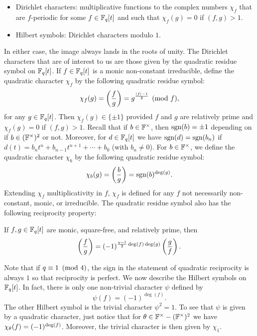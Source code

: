 \documentclass[12pt,reqno,oneside]{amsart}
\begin{document}
        \begin{itemize}
            \item Dirichlet characters: multiplicative functions to the complex numbers $\chi_{f}$ that are $f$-periodic for some $f \in \mathbb{F}_{q}[t]$ and such that $\chi_{f}(g) = 0$ if $(f,g) > 1$.
            \item Hilbert symbols: Dirichlet characters modulo $1$.
        \end{itemize}
        
        In either case, the image always lands in the roots of unity. The Dirichlet characters that are of interest to us are those given by the quadratic residue symbol on $\mathbb{F}_{q}[t]$. If $f \in \mathbb{F}_{q}[t]$ is a monic non-constant irreducible, define the quadratic character $\chi_{f}$ by the following quadratic residue symbol:
        \[
            \chi_{f}(g) = \left(\frac{f}{g}\right) = g^{\frac{|f|-1}{2}} \pmod{f},
        \]
        for any $g \in \mathbb{F}_{q}[t]$. Then $\chi_{f}(g) \in \{\pm 1\}$ provided $f$ and $g$ are relatively prime and $\chi_{f}(g) = 0$ if $(f,g) > 1$. Recall that if $b \in \mathbb{F}^{\times}$, then $\operatorname{\mathrm{sgn}}(b) = \pm1$ depending on if $b \in (\mathbb{F}^{\times})^{2}$ or not. Moreover, for $d \in \mathbb{F}_{q}[t]$ we have $\operatorname{\mathrm{sgn}}(d) = \operatorname{\mathrm{sgn}}(b_{n})$ if $d(t) = b_{n}t^{n}+b_{n-1}t^{n+1}+\cdots+b_{0}$ (with $b_{n} \neq 0$). For $b \in \mathbb{F}^{\times}$, we define the quadratic character $\chi_{b}$ by the following quadratic residue symbol:
        \[
            \chi_{b}(g) = \left(\frac{b}{g}\right) = \operatorname{\mathrm{sgn}}(b)^{\deg(g)}.
        \]
        Extending $\chi_{f}$ multiplicativity in $f$, $\chi_{f}$ is defined for any $f$ not necessarily non-constant, monic, or irreducible. The quadratic residue symbol also has the following reciprocity property:

        \begin{theorem}
            If $f,g \in \mathbb{F}_{q}[t]$ are monic, square-free, and relatively prime, then
            \[
                \left(\frac{f}{g}\right) = (-1)^{\frac{q-1}{2}\deg(f)\deg(g)}\left(\frac{g}{f}\right).
            \]
        \end{theorem}

        Note that if $q \equiv 1 \ \left(\text{mod }4\right)$, the sign in the statement of quadratic reciprocity is always $1$ so that reciprocity is perfect. We now describe the Hilbert symbols on $\mathbb{F}_{q}[t]$. In fact, there is only one non-trivial character $\psi$ defined by
        \[
            \psi(f) = (-1)^{\deg(f)}.
        \]
        The other Hilbert symbol is the trivial character $\psi^{2} = 1$. To see that $\psi$ is given by a quadratic character, just notice that for $\theta \in \mathbb{F}^{\times}-(\mathbb{F}^{\times})^{2}$ we have $\chi_{\theta}(f) = (-1)^{\deg(f)}$. Moreover, the trivial character is then given by $\chi_{1}$.
\end{document}

